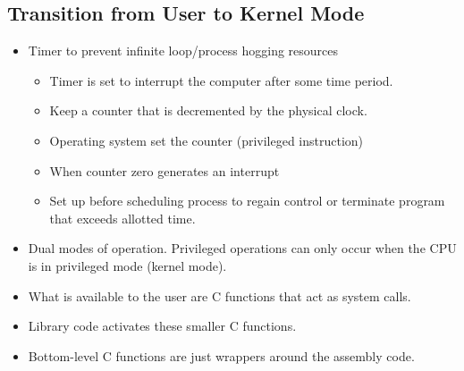\documentclass[]{article}
\begin{document}
\subsection{Transition from User to Kernel Mode}
\begin{itemize}
\item Timer to prevent infinite loop/process hogging resources
\begin{itemize}
\item Timer is set to interrupt the computer after some time period.
\item Keep a counter that is decremented by the physical clock.
\item Operating system set the counter (privileged instruction)
\item When counter zero generates an interrupt
\item Set up before scheduling process to regain control or terminate program
that exceeds allotted time.
\end{itemize}
\item Dual modes of operation. Privileged operations can only occur when the CPU
is in privileged mode (kernel mode).
\item What is available to the user are C functions that act as system calls.
\item Library code activates these smaller C functions.
\item Bottom-level C functions are just wrappers around the assembly code.
\end{itemize}
\end{document}
